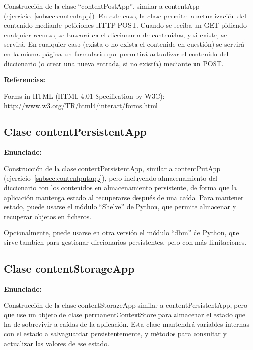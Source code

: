 Construcción de la clase ``contentPostApp'', similar a contentApp (ejercicio~\ref{subsec:contentapp}). En este caso, la clase permite la actualización del contenido mediante peticiones HTTP POST. Cuando se reciba un GET pidiendo cualquier recurso, se buscará en el diccionario de contenidos, y si existe, se servirá. En cualquier caso (exista o no exista el contenido en cuestión) se servirá en la misma página un formulario que permitirá actualizar el contenido del diccionario (o crear una nueva entrada, si no existía) mediante un POST.

\textbf{Referencias:}

Forms in HTML (HTML 4.01 Specification by W3C): \\
\url{http://www.w3.org/TR/html4/interact/forms.html}

\subsection{Clase contentPersistentApp}
\label{subsec:contentpersistentapp}

\textbf{Enunciado:}

Construcción de la clase contentPersistentApp, similar a contentPutApp (ejercicio~\ref{subsec:contentputapp}), pero incluyendo almacenamiento del diccionario con los contenidos en almacenamiento persistente, de forma que la aplicación mantenga estado al recuperarse después de una caída. Para mantener estado, puede usarse el módulo ``Shelve'' de Python, que permite almacenar y recuperar objetos en ficheros.

Opcionalmente, puede usarse en otra versión el módulo ``dbm'' de Python, que sirve también para gestionar diccionarios persistentes, pero con más limitaciones.

\subsection{Clase contentStorageApp}
\label{subsec:contentstorageapp}

\textbf{Enunciado:}

Construcción de la clase contentStorageApp similar a contentPersistentApp, pero que use un objeto de clase permanentContentStore para almacenar el estado que ha de sobrevivir a caídas de la aplicación. Esta clase mantendrá variables internas con el estado a salvaguardar persistentemente, y métodos para consultar y actualizar los valores de ese estado.

